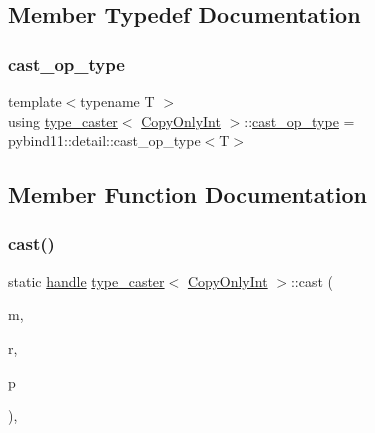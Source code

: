 \subsection{Member Typedef Documentation}
\mbox{\label{structtype__caster_3_01_copy_only_int_01_4_a6d1c309a3d49f804c93051f1da9f87e6}} 
\subsubsection{\texorpdfstring{cast\_op\_type}{cast\_op\_type}}
{\footnotesize\ttfamily template$<$typename T $>$ \\
using \mbox{\hyperlink{classtype__caster}{type\+\_\+caster}}$<$ \mbox{\hyperlink{class_copy_only_int}{Copy\+Only\+Int}} $>$\+::\mbox{\hyperlink{structtype__caster_3_01_copy_only_int_01_4_a6d1c309a3d49f804c93051f1da9f87e6}{cast\+\_\+op\+\_\+type}} =  pybind11\+::detail\+::cast\+\_\+op\+\_\+type$<$T$>$}



\subsection{Member Function Documentation}
\mbox{\label{structtype__caster_3_01_copy_only_int_01_4_ab24bacf3d721f0ba09b53b0ee2af1fc8}} 
\subsubsection{\texorpdfstring{cast()}{cast()}\hspace{0.1cm}{\footnotesize\ttfamily [1/2]}}
{\footnotesize\ttfamily static \mbox{\hyperlink{classhandle}{handle}} \mbox{\hyperlink{classtype__caster}{type\+\_\+caster}}$<$ \mbox{\hyperlink{class_copy_only_int}{Copy\+Only\+Int}} $>$\+::cast (\begin{DoxyParamCaption}\item[{const \mbox{\hyperlink{class_copy_only_int}{Copy\+Only\+Int}} \&}]{m,  }\item[{\mbox{\hyperlink{detail_2common_8h_adde72ab1fb0dd4b48a5232c349a53841}{return\+\_\+value\+\_\+policy}}}]{r,  }\item[{\mbox{\hyperlink{classhandle}{handle}}}]{p }\end{DoxyParamCaption})\hspace{0.3cm}{\ttfamily [inline]}, {\ttfamily [static]}}

